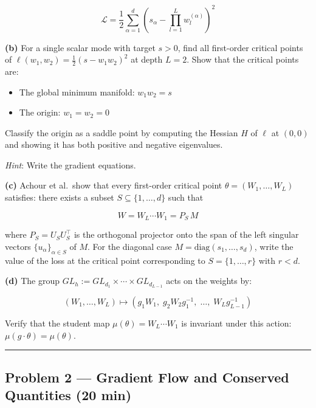 \documentclass[
]{article}
\providecommand{\tightlist}{%
  \setlength{\itemsep}{0pt}\setlength{\parskip}{0pt}}
\begin{document}
\[\mathcal{L} = \frac{1}{2}\sum_{\alpha=1}^d \left(s_\alpha - \prod_{l=1}^L w_l^{(\alpha)}\right)^2\]

\textbf{(b)} For a single scalar mode with target \(s > 0\), find all
first-order critical points of
\(\ell(w_1, w_2) = \frac{1}{2}(s - w_1 w_2)^2\) at depth \(L = 2\). Show
that the critical points are:

\begin{itemize}
\tightlist
\item
  The global minimum manifold: \(w_1 w_2 = s\)
\item
  The origin: \(w_1 = w_2 = 0\)
\end{itemize}

Classify the origin as a saddle point by computing the Hessian \(H\) of
\(\ell\) at \((0,0)\) and showing it has both positive and negative
eigenvalues.

\emph{Hint}: Write the gradient equations.

\textbf{(c)} Achour et al.~show that every
first-order critical point \(\theta = (W_1, \ldots, W_L)\) satisfies:
there exists a subset \(S \subseteq \{1, \ldots, d\}\) such that

\[W = W_L \cdots W_1 = P_S\, M\]

where \(P_S = U_S U_S^\top\) is the orthogonal projector onto the span
of the left singular vectors \(\{u_\alpha\}_{\alpha \in S}\) of \(M\).
For the diagonal case \(M = \text{diag}(s_1, \ldots, s_d)\), write the
value of the loss at the critical point corresponding to
\(S = \{1, \ldots, r\}\) with \(r < d\).

\textbf{(d)} The group
\(GL_h := GL_{d_1} \times \cdots \times GL_{d_{L-1}}\) acts on the
weights by:

\[(W_1, \ldots, W_L) \mapsto (g_1 W_1,\; g_2 W_2 g_1^{-1},\; \ldots,\; W_L g_{L-1}^{-1})\]

Verify that the student map \(\mu(\theta) = W_L \cdots W_1\) is
invariant under this action: \(\mu(g \cdot \theta) = \mu(\theta)\).

\begin{center}\rule{0.5\linewidth}{0.5pt}\end{center}

\subsection{Problem 2 --- Gradient Flow and Conserved Quantities (20
min)}\label{problem-2-gradient-flow-and-conserved-quantities-20-min}
\end{document}
